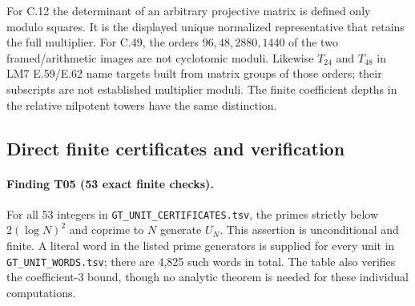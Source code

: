 For C.12 the determinant of an arbitrary projective matrix is defined
only modulo squares. It is the displayed unique normalized
representative that retains the full multiplier. For C.49, the orders
$96,48,2880,1440$ of the two framed/arithmetic images are not
cyclotomic moduli. Likewise $T_{24}$ and $T_{48}$ in LM7 E.59/E.62
name targets built from matrix groups of those orders; their subscripts
are not established multiplier moduli. The finite coefficient depths
in the relative nilpotent towers have the same distinction.

\subsection{Direct finite certificates and verification}

\paragraph{Finding T05 (53 exact finite checks).}
For all 53 integers in \texttt{GT\_UNIT\_CERTIFICATES.tsv}, the primes
strictly below $2(\log N)^2$ and coprime to $N$ generate $U_N$.
This assertion is unconditional and finite. A literal word in the
listed prime generators is supplied for every unit in
\texttt{GT\_UNIT\_WORDS.tsv}; there are 4,825 such words in total.
The table also verifies the coefficient-$3$ bound, though no analytic
theorem is needed for these individual computations.

